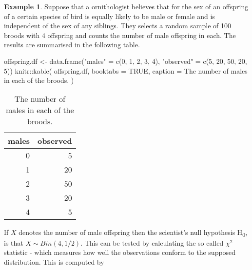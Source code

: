 \documentclass[
]{book}
\newenvironment{Shaded}{\begin{snugshade}}{\end{snugshade}}
\newcommand{\AttributeTok}[1]{\textcolor[rgb]{0.77,0.63,0.00}{#1}}
\newcommand{\ConstantTok}[1]{\textcolor[rgb]{0.00,0.00,0.00}{#1}}
\newcommand{\DecValTok}[1]{\textcolor[rgb]{0.00,0.00,0.81}{#1}}
\newcommand{\FloatTok}[1]{\textcolor[rgb]{0.00,0.00,0.81}{#1}}
\newcommand{\FunctionTok}[1]{\textcolor[rgb]{0.00,0.00,0.00}{#1}}
\newcommand{\NormalTok}[1]{#1}
\newcommand{\OtherTok}[1]{\textcolor[rgb]{0.56,0.35,0.01}{#1}}
\newcommand{\SpecialCharTok}[1]{\textcolor[rgb]{0.00,0.00,0.00}{#1}}
\newcommand{\StringTok}[1]{\textcolor[rgb]{0.31,0.60,0.02}{#1}}
\theoremstyle{definition}
\theoremstyle{definition}
\newtheorem{example}{Example}[chapter]
\theoremstyle{definition}
\theoremstyle{definition}
\theoremstyle{remark}
\begin{document}
\begin{example}
Suppose that a ornithologist believes that for the sex of an offspring of a certain species of bird is equally likely to be male or female and is independent of the sex of any siblings. They selects a random sample of 100 broods with 4 offspring and counts the number of male offspring in each. The results are summarised in the following table.

\begin{Shaded}
\begin{Highlighting}[]
\NormalTok{offspring.df }\OtherTok{\textless{}{-}} \FunctionTok{data.frame}\NormalTok{(}\StringTok{"males"} \OtherTok{=} \FunctionTok{c}\NormalTok{(}\DecValTok{0}\NormalTok{, }\DecValTok{1}\NormalTok{, }\DecValTok{2}\NormalTok{, }\DecValTok{3}\NormalTok{, }\DecValTok{4}\NormalTok{), }
                           \StringTok{"observed"} \OtherTok{=} \FunctionTok{c}\NormalTok{(}\DecValTok{5}\NormalTok{, }\DecValTok{20}\NormalTok{, }\DecValTok{50}\NormalTok{, }\DecValTok{20}\NormalTok{, }\DecValTok{5}\NormalTok{))}
\NormalTok{knitr}\SpecialCharTok{::}\FunctionTok{kable}\NormalTok{(}
\NormalTok{  offspring.df, }\AttributeTok{booktabs =} \ConstantTok{TRUE}\NormalTok{,}
  \AttributeTok{caption =} \StringTok{\textquotesingle{}The number of males in each of the broods.\textquotesingle{}}
\NormalTok{  )}
\end{Highlighting}
\end{Shaded}

\begin{table}

\caption{\label{tab:unnamed-chunk-2}The number of males in each of the broods.}
\centering
\begin{tabular}[t]{rr}
\toprule
males & observed\\
\midrule
0 & 5\\
1 & 20\\
2 & 50\\
3 & 20\\
4 & 5\\
\bottomrule
\end{tabular}
\end{table}

If \(X\) denotes the number of male offspring then the scientist's null hypothesis H\textsubscript{0}, is that \(X \sim Bin(4, 1/2)\). This can be tested by calculating the so called \(\chi^2\) statistic - which measures how well the observations conform to the supposed distribution. This is computed by

\begin{Shaded}
\end{Shaded}
\end{example}
\end{document}
